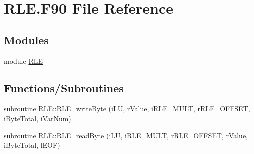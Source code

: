 \hypertarget{_r_l_e_8_f90}{
\section{RLE.F90 File Reference}
\label{_r_l_e_8_f90}
}
\subsection*{Modules}
\begin{DoxyCompactItemize}
\item 
module \hyperlink{namespace_r_l_e}{RLE}
\end{DoxyCompactItemize}
\subsection*{Functions/Subroutines}
\begin{DoxyCompactItemize}
\item 
subroutine \hyperlink{namespace_r_l_e_a2e9e849815a1bcf1205b52ab3abce6b2}{RLE::RLE\_\-writeByte} (iLU, rValue, iRLE\_\-MULT, rRLE\_\-OFFSET, iByteTotal, iVarNum)
\item 
subroutine \hyperlink{namespace_r_l_e_ad4af726c9f6888eff2870258c8fb75de}{RLE::RLE\_\-readByte} (iLU, iRLE\_\-MULT, rRLE\_\-OFFSET, rValue, iByteTotal, lEOF)
\end{DoxyCompactItemize}
